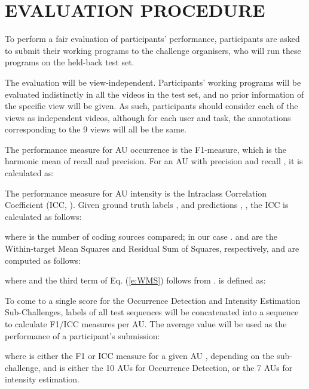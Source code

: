 \documentclass[a4paper, 10pt, conference]{ieeeconf}      \usepackage{FG2017}
\begin{document}
\section{EVALUATION PROCEDURE}
\noindent To perform a fair evaluation of participants' performance, participants are asked to submit their working programs to the challenge organisers, who will run these programs on the held-back test set. 

The evaluation will be view-independent. Participants' working programs will be evaluated indistinctly in all the videos in the test set, and no prior information of the specific view will be given. As such, participants should consider each of the views as independent videos, although for each user and task, the annotations corresponding to the 9 views will all be the same. 

The performance measure for AU occurrence is the F1-measure, which is the harmonic mean of recall and precision. For an AU with precision  and recall , it is calculated as:



The performance measure for AU intensity is the Intraclass Correlation Coefficient (ICC, \cite{ShroutFleiss1979_ICU}). Given ground truth labels ,  and predictions , , the ICC  is calculated as follows: 





\noindent where  is the number of coding sources compared; in our case .   and  are the Within-target Mean Squares and Residual Sum of Squares, respectively, and are computed as follows:



\noindent where  and the third term of Eq. (\ref{e:WMS}) follows from .  is defined as:








To come to a single score  for the Occurrence Detection and Intensity Estimation Sub-Challenges, labels of all test sequences will be concatenated into a sequence to calculate F1/ICC measures per AU. The average value will be used as the performance of a participant's submission:



\noindent where  is either the F1 or ICC measure for a given AU , depending on the sub-challenge, and  is either the 10 AUs for Occurrence Detection, or the 7 AUs for intensity estimation. 
\end{document}
